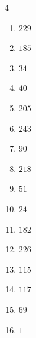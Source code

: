 \begin{multicols}{4}
\begin{enumerate}
  \item $229$


  \item $185$


  \item $34$


  \item $40$


  \item $205$


  \item $243$


  \item $90$


  \item $218$


  \item $51$


  \item $24$


  \item $182$


  \item $226$


  \item $115$


  \item $117$


\columnbreak %

  \item $69$


  \item $1$


\end{enumerate}
\end{multicols}
